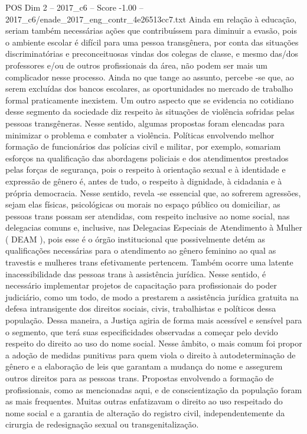 \begin{textsample}{POS Dim 2 – 2017\_c6 – Score -1.00 – 2017\_c6/enade\_2017\_eng\_contr\_4e26513cc7.txt}
Ainda em relação à educação, seriam também necessárias ações que contribuíssem para diminuir a evasão, pois o ambiente escolar é difícil para uma pessoa transgênera, por conta das situações discriminatórias e preconceituosas vindas dos colegas de classe, e mesmo das/dos professores e/ou de outros profissionais da área, não podem ser mais um complicador nesse processo.
Ainda no que tange ao assunto, percebe -se que, ao serem excluídas dos bancos escolares, as oportunidades no mercado de trabalho formal praticamente inexistem.
Um outro aspecto que se evidencia no cotidiano desse segmento da sociedade diz respeito às situações de violência sofridas pelas pessoas transgêneras.
Nesse sentido, algumas propostas foram elencadas para minimizar o problema e combater a violência.
Políticas envolvendo melhor formação de funcionários das polícias civil e militar, por exemplo, somariam esforços na qualificação das abordagens policiais e dos atendimentos prestados pelas forças de segurança, pois o respeito à orientação sexual e à identidade e expressão de gênero é, antes de tudo, o respeito à dignidade, à cidadania e à própria democracia.
Nesse sentido, revela -se essencial que, ao sofrerem agressões, sejam elas físicas, psicológicas ou morais no espaço público ou domiciliar, as pessoas trans possam ser atendidas, com respeito inclusive ao nome social, nas delegacias comuns e, inclusive, nas Delegacias Especiais de Atendimento à Mulher ( DEAM ), pois esse é o órgão institucional que possivelmente detém as qualificações necessárias para o atendimento ao gênero feminino ao qual as travestis e mulheres trans efetivamente pertencem.
Também ocorre uma latente inacessibilidade das pessoas trans à assistência jurídica.
Nesse sentido, é necessário implementar projetos de capacitação para profissionais do poder judiciário, como um todo, de modo a prestarem a assistência jurídica gratuita na defesa intransigente dos direitos sociais, civis, trabalhistas e políticos dessa população.
Dessa maneira, a Justiça agiria de forma mais acessível e sensível para o segmento, que terá suas especificidades observadas a começar pelo devido respeito do direito ao uso do nome social.
Nesse âmbito, o mais comum foi propor a adoção de medidas punitivas para quem viola o direito à autodeterminação de gênero e a elaboração de leis que garantam a mudança do nome e assegurem outros direitos para as pessoas trans.
Propostas envolvendo a formação de profissionais, como as mencionadas aqui, e de conscientização da população foram as mais frequentes.
Muitas outras enfatizavam o direito ao uso respeitado do nome social e a garantia de alteração do registro civil, independentemente da cirurgia de redesignação sexual ou transgenitalização.

\end{textsample}
